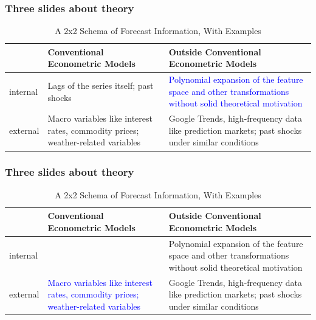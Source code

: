 \documentclass[9pt]{beamer}
\theoremstyle{definition}
\begin{document}
\begin{frame}\frametitle{Three slides about theory}
   
    \begin{table}[htb]
        \centering %
        \caption{A 2x2 Schema of Forecast Information, With Examples}
        \begin{tabular}{ | p{1cm} | p{4.8cm}| p{4.8cm} | } 
          \hline
          & Conventional Econometric Models & Outside Conventional Econometric Models\\ 
          \hline
          internal & Lags of the series itself; past shocks & \textcolor{blue}{Polynomial expansion of the feature space and other transformations without solid theoretical motivation} \\
          \hline
          external & Macro variables like interest rates, commodity prices; weather-related variables & Google Trends, high-frequency data like prediction markets; past shocks under similar conditions \\ 
          \hline
        \end{tabular}
      \end{table}
\end{frame}
\begin{frame}\frametitle{Three slides about theory}
   
    \begin{table}[htb]
        \centering %
        \caption{A 2x2 Schema of Forecast Information, With Examples}
        \begin{tabular}{ | p{1cm} | p{4.8cm}| p{4.8cm} | } 
          \hline
          & Conventional Econometric Models & Outside Conventional Econometric Models\\ 
          \hline
          internal & & Polynomial expansion of the feature space and other transformations without solid theoretical motivation \\
          \hline
          external & \textcolor{blue}{Macro variables like interest rates, commodity prices; weather-related variables} & Google Trends, high-frequency data like prediction markets; past shocks under similar conditions \\ 
          \hline
        \end{tabular}
      \end{table}
\end{frame}
\end{document}
